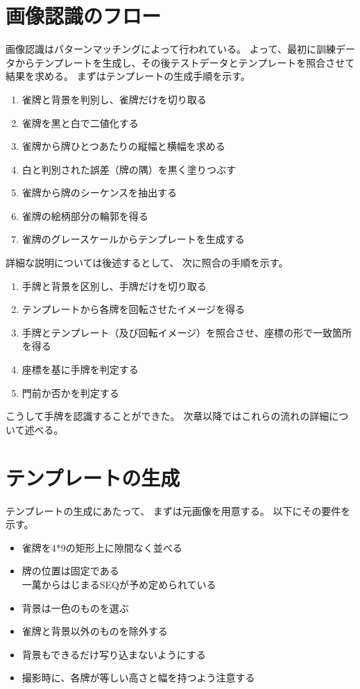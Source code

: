 \documentclass{jsarticle}
\begin{document}
\begin{multicols}{2}
\section{画像認識のフロー}

画像認識はパターンマッチングによって行われている。
よって、最初に訓練データからテンプレートを生成し、その後テストデータとテンプレートを照合させて結果を求める。
まずはテンプレートの生成手順を示す。
\begin{enumerate}
\item 雀牌と背景を判別し、雀牌だけを切り取る
\item 雀牌を黒と白で二値化する
\item 雀牌から牌ひとつあたりの縦幅と横幅を求める
\item 白と判別された誤差（牌の隅）を黒く塗りつぶす
\item 雀牌から牌のシーケンスを抽出する
\item 雀牌の絵柄部分の輪郭を得る
\item 雀牌のグレースケールからテンプレートを生成する
\end{enumerate}

詳細な説明については後述するとして、
次に照合の手順を示す。
\begin{enumerate}
\item 手牌と背景を区別し、手牌だけを切り取る
\item テンプレートから各牌を回転させたイメージを得る
\item 手牌とテンプレート（及び回転イメージ）を照合させ、座標の形で一致箇所を得る
\item 座標を基に手牌を判定する
\item 門前か否かを判定する
\end{enumerate}

こうして手牌を認識することができた。
次章以降ではこれらの流れの詳細について述べる。

\section{テンプレートの生成}

テンプレートの生成にあたって、
まずは元画像を用意する。
以下にその要件を示す。
\begin{itemize}
\item 雀牌を4*9の矩形上に隙間なく並べる
\item 牌の位置は固定である \\
		  一萬からはじまるSEQが予め定められている
\item 背景は一色のものを選ぶ
\item 雀牌と背景以外のものを除外する
\item 背景もできるだけ写り込まないようにする
\item 撮影時に、各牌が等しい高さと幅を持つよう注意する
\end{itemize}


\end{multicols}
\end{document}
